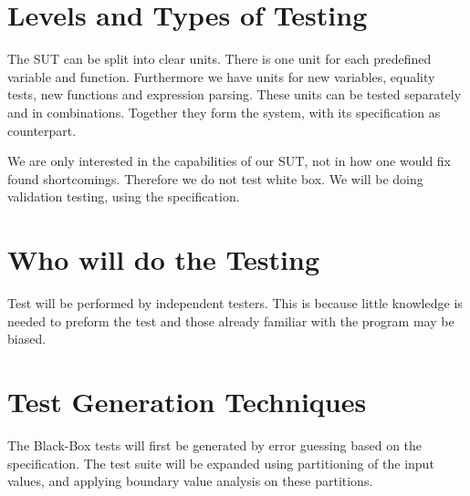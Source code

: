 \documentclass[11pt,a4paper]{article}
\begin{document}
\section{Levels and Types of Testing} \label{levels}

The SUT can be split into clear units. There is one unit for each predefined variable and function. Furthermore we have units for new variables, equality tests, new functions and expression parsing. These units can be tested separately and in combinations. Together they form the system, with its specification as counterpart.

We are only interested in the capabilities of our SUT, not in how one would fix found shortcomings. Therefore we do not test white box. We will be doing validation testing, using the specification.


\section{Who will do the Testing}

Test will be performed by independent testers. This is because little
knowledge is needed to preform the test and those already familiar
with the program may be biased.


\section{Test Generation Techniques}
The Black-Box tests will first be generated by error guessing based on the specification. The test suite will be expanded using partitioning of the input values, and applying boundary value analysis on these partitions.


\end{document}
